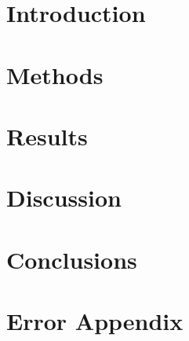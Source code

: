 \documentclass[10pt, twocolumn, nobalancelastpage]{article}    %
\title{}
\author{M. Rossetter (and ) \\  L1 Discovery Labs, Lab Group D, Thursday}
\date{\vspace{-0.30cm}Submitted: \today{}; Date of Experiment: /2017\vspace{-0.7cm}}
\begin{document}
	\twocolumn[
	\maketitle %
	\begin{onecolabstract}

	\end{onecolabstract}
	]
	\thispagestyle{plain} %



	\section{Introduction}

	\section{Methods}

	\section{Results}

	\section{Discussion}

	\section{Conclusions}

	\begin{thebibliography}{}

	\end{thebibliography}

	\newpage
	\section{Error Appendix}
\end{document}

